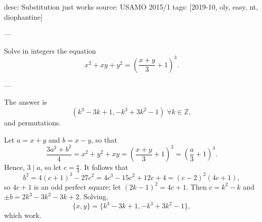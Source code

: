 desc: Substitution just works
source: USAMO 2015/1
tags: [2019-10, oly, easy, nt, diophantine]

---

Solve in integers the equation \[x^2+xy+y^2=\left(\frac{x+y}3+1\right)^3.\]

---

The answer is \[\boxed{(k^3-3k+1,-k^3+3k^2-1)}\;\forall k\in\mathbb Z,\]
and permutations.

Let $a=x+y$ and $b=x-y$, so that \[\frac{3a^2+b^2}4=x^2+y^2+xy=\left(\frac{x+y}3+1\right)^3=\left(\frac a3+1\right)^3.\]
Hence, $3\mid a$, so let $c=\tfrac a3$. It follows that \[b^2=4(c+1)^3-27c^2=4c^3-15c^2+12c+4=(c-2)^2(4c+1),\]
so $4c+1$ is an odd perfect square; let $(2k-1)^2=4c+1$. Then $c=k^2-k$ and $\pm b=2k^3-3k^2-3k+2$. Solving, \[\{x,y\}=\{k^3-3k+1,-k^3+3k^2-1\},\]
which work.
